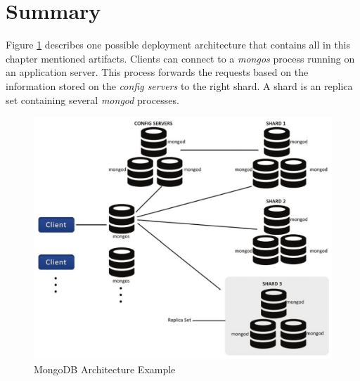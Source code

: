 \section{Summary}
Figure \ref{arch-example} describes one possible deployment architecture that contains all in this chapter mentioned artifacts. Clients can connect to a \textit{mongos} process running on an application server. This process forwards the requests based on the information stored on the \textit{config servers} to the right shard. A shard is an replica set containing several \textit{mongod} processes.
\begin{figure}[H]
\includegraphics[width=\linewidth,keepaspectratio]{images/deployment.png}
\caption{MongoDB Architecture Example}
\label{arch-example}
\end{figure}


